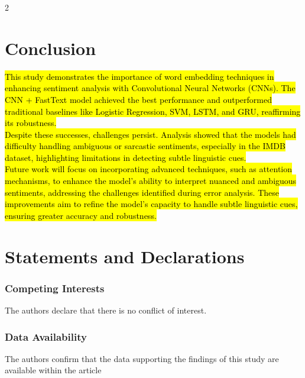 \documentclass[10pt,a4paper]{article}
\begin{document}
\begin{multicols}{2}
\begin{threeparttable}[H]
\label{results}
\end{threeparttable}


\section*{Conclusion}
\hl{This study demonstrates the importance of word embedding techniques in enhancing sentiment analysis with Convolutional Neural Networks (CNNs). The CNN + FastText model achieved the best performance and outperformed traditional baselines like Logistic Regression, SVM, LSTM, and GRU, reaffirming its robustness.\\
Despite these successes, challenges persist. Analysis showed that the models had difficulty handling ambiguous or sarcastic sentiments, especially in the IMDB dataset, highlighting limitations in detecting subtle linguistic cues. \\
Future work will focus on incorporating advanced techniques, such as attention mechanisms, to enhance the model’s ability to interpret nuanced and ambiguous sentiments, addressing the challenges identified during error analysis. These improvements aim to refine the model’s capacity to handle subtle linguistic cues, ensuring greater accuracy and robustness. }



\section*{Statements and Declarations}
\subsubsection*{Competing Interests}
The authors declare that there is no conflict of interest.
\subsubsection*{Data Availability}
The authors confirm that the data supporting the findings of this study are available within the article
\end{multicols}
\end{document}
